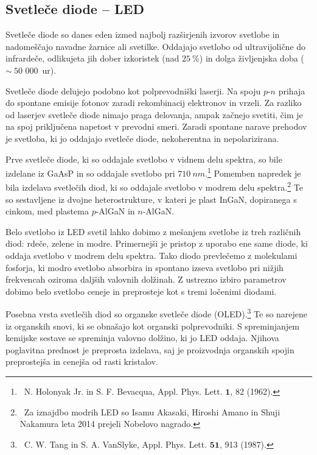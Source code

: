 \subsection{Svetleče diode -- LED}
Svetleče diode so danes eden izmed najbolj razširjenih izvorov svetlobe in nadomeščajo
navadne žarnice ali svetilke. Oddajajo svetlobo od ultravijolične do infrardeče, 
odlikujeta jih 
dober izkoristek (nad $25~\%$) in dolga življenjska doba ($\sim~50\,\,000$~ur).

Svetleče diode delujejo podobno kot polprevodniški laserji. Na spoju $p$-$n$ prihaja do 
spontane emisije fotonov zaradi rekombinacij elektronov in vrzeli. Za razliko od laserjev 
svetleče diode nimajo praga delovanja, ampak začnejo svetiti, čim je na spoj priključena 
napetost v prevodni smeri. Zaradi spontane narave prehodov je svetloba, ki jo oddajajo
svetleče diode, nekoherentna in nepolarizirana. 

Prve svetleče diode, ki so oddajale svetlobo v vidnem delu spektra,
so bile izdelane iz GaAsP in so oddajale 
svetlobo pri $710~\si{nm}$.\footnote{~N. Holonyak Jr. in S. F. Bevacqua, Appl. Phys. Lett.
${\mathbf 1}$, 82 (1962).} Pomemben
napredek je bila izdelava svetlečih diod, ki so oddajale svetlobo v modrem delu 
spektra.\footnote{~Za iznajdbo modrih LED so Isamu Akasaki, Hiroshi Amano in 
Shuji Nakamura leta 2014 prejeli Nobelovo nagrado.} Te so sestavljene iz dvojne
heterostrukture, v kateri je plast InGaN, dopiranega s cinkom, 
med plastema $p$-AlGaN in $n$-AlGaN.

Belo svetlobo iz LED svetil lahko dobimo z mešanjem svetlobe iz treh različnih 
diod: rdeče, zelene in modre. Primernejši je pristop z uporabo ene same diode, 
ki oddaja svetlobo v modrem delu spektra. Tako diodo prevlečemo z 
molekulami fosforja, ki
modro svetlobo absorbira in spontano izseva svetlobo pri nižjih frekvencah 
oziroma daljših valovnih dolžinah. Z ustrezno izbiro parametrov dobimo belo svetlobo
ceneje in preprosteje kot s tremi ločenimi diodami. 

\begin{remark}
Posebna vrsta svetlečih diod so organske svetleče diode (OLED).\footnote{~C. W. Tang in
S. A. VanSlyke, Appl. Phys. Lett. $\mathbf{51}$, 913 (1987).} Te so narejene iz
organskih snovi, ki se obnašajo kot organski polprevodniki. S spreminjanjem kemijske
sestave se spreminja valovno dolžino, ki jo LED oddaja. Njihova poglavitna prednost
je preprosta izdelava, saj je proizvodnja organskih spojin preprostejša in cenejša
od rasti kristalov. 
\end{remark}

